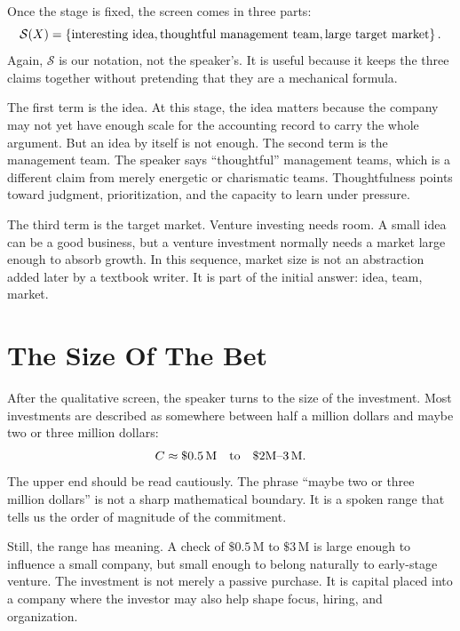 Once the stage is fixed, the screen comes in three parts:
\begin{equation}
\mathcal{S}(X)
=
\left\{
\hbox{interesting idea},
\hbox{thoughtful management team},
\hbox{large target market}
\right\}.
\end{equation}
Again, \(\mathcal{S}\) is our notation, not the speaker's. It is useful because it keeps the three claims together without pretending that they are a mechanical formula.

The first term is the idea. At this stage, the idea matters because the company may not yet have enough scale for the accounting record to carry the whole argument. But an idea by itself is not enough. The second term is the management team. The speaker says ``thoughtful'' management teams, which is a different claim from merely energetic or charismatic teams. Thoughtfulness points toward judgment, prioritization, and the capacity to learn under pressure.

The third term is the target market. Venture investing needs room. A small idea can be a good business, but a venture investment normally needs a market large enough to absorb growth. In this sequence, market size is not an abstraction added later by a textbook writer. It is part of the initial answer: idea, team, market.

\section{The Size Of The Bet}

After the qualitative screen, the speaker turns to the size of the investment. Most investments are described as somewhere between half a million dollars and maybe two or three million dollars:
\begin{equation}
C \approx \$0.5\,\text{M}
\quad \hbox{to} \quad
\$2\text{M--}3\,\text{M}.
\end{equation}
The upper end should be read cautiously. The phrase ``maybe two or three million dollars'' is not a sharp mathematical boundary. It is a spoken range that tells us the order of magnitude of the commitment.

Still, the range has meaning. A check of \( \$0.5\,\text{M} \) to \( \$3\,\text{M} \) is large enough to influence a small company, but small enough to belong naturally to early-stage venture. The investment is not merely a passive purchase. It is capital placed into a company where the investor may also help shape focus, hiring, and organization.

